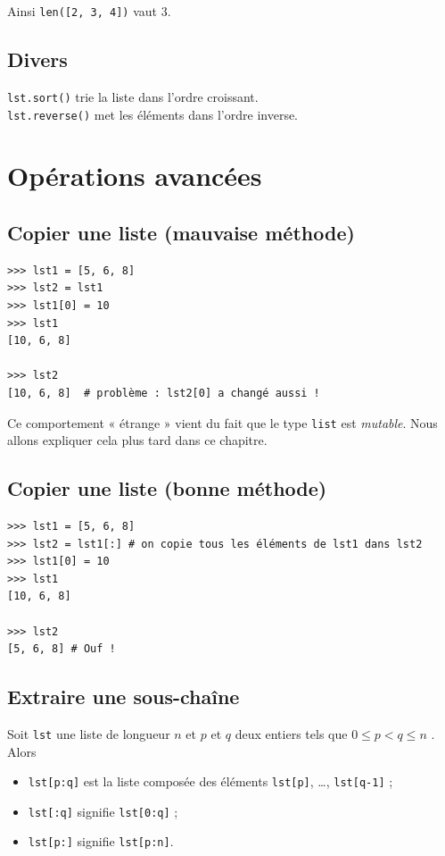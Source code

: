 Ainsi \texttt{len([2, 3, 4])} vaut 3.

\subsection{Divers}
\texttt{lst.sort()} trie la liste dans l'ordre croissant.\\

\texttt{lst.reverse()} met les éléments dans l'ordre inverse.

\section{Opérations avancées}


\subsection{Copier une liste (mauvaise méthode)}
\begin{pyc}
	\begin{verbatim}
>>> lst1 = [5, 6, 8]
>>> lst2 = lst1
>>> lst1[0] = 10
>>> lst1
[10, 6, 8]

>>> lst2
[10, 6, 8]  # problème : lst2[0] a changé aussi !
\end{verbatim}
\end{pyc}

Ce comportement « étrange » vient du fait que le type \texttt{list} est \textit{mutable}. Nous allons expliquer cela plus tard dans ce chapitre.

\subsection{Copier une liste (bonne méthode)}
\begin{pyc}
	\begin{verbatim}
>>> lst1 = [5, 6, 8]
>>> lst2 = lst1[:] # on copie tous les éléments de lst1 dans lst2
>>> lst1[0] = 10
>>> lst1
[10, 6, 8]

>>> lst2
[5, 6, 8] # Ouf !
\end{verbatim}
\end{pyc}

\subsection{Extraire une sous-chaîne}
Soit \texttt{lst} une liste de longueur $n$ et $p$ et $q$ deux entiers tels que $0\leqslant p <q\leqslant n$ . Alors
\begin{itemize}
	\item \texttt{lst[p:q]} est la liste composée des éléments \texttt{lst[p]}, \ldots, \texttt{lst[q-1]} ;
	\item \texttt{lst[:q]} signifie \texttt{lst[0:q]} ;
	\item \texttt{lst[p:]} signifie \texttt{lst[p:n]}.
\end{itemize}




